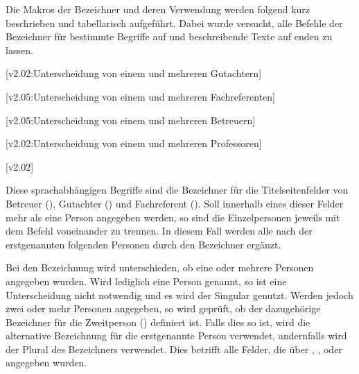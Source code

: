 \begin{DeclareEntity*}{}
\begin{DeclareEntity*}{}
\begin{DeclareEntity*}{}
Die Makros der Bezeichner und deren Verwendung werden folgend kurz beschrieben 
und tabellarisch aufgeführt. Dabei wurde versucht, alle Befehle der Bezeichner 
für bestimmte Begriffe auf  und beschreibende Texte auf 
 enden zu lassen.

\begin{Declaration}
  {}
  [v2.02:Unterscheidung von einem und mehreren Gutachtern]
\begin{Declaration}
  {}
\begin{Declaration}
  {}
  [v2.05:Unterscheidung von einem und mehreren Fachreferenten]
\begin{Declaration}
  {}
\begin{Declaration}
  {}
  [v2.05:Unterscheidung von einem und mehreren Betreuern]
\begin{Declaration}
  {}
\begin{Declaration}
  {}
  [v2.02:Unterscheidung von einem und mehreren Professoren]
\begin{Declaration}
  {}
  [v2.02]

Diese sprachabhängigen Begriffe sind die Bezeichner für die Titelseitenfelder 
von Betreuer (), Gutachter () und Fachreferent 
(). Soll innerhalb eines dieser Felder mehr als eine Person 
angegeben werden, so sind die Einzelpersonen jeweils mit dem Befehl  
voneinander zu trennen. In diesem Fall werden alle nach der erstgenannten 
folgenden Personen durch den Bezeichner  ergänzt.

%
Bei den Bezeichnung wird unterschieden, ob eine oder mehrere Personen angegeben 
wurden. Wird lediglich eine Person genannt, so ist eine Unterscheidung nicht 
notwendig und es wird der Singular genutzt. Werden jedoch zwei oder mehr 
Personen angegeben, so wird geprüft, ob der dazugehörige Bezeichner für die 
Zweitperson () definiert ist. Falls dies so ist, wird 
die alternative Bezeichnung für die erstgenannte Person verwendet, andernfalls 
wird der Plural des Bezeichners verwendet. Dies betrifft alle Felder, die über 
, ,  oder  
angegeben wurden.


\end{Declaration}
\end{Declaration}
\end{Declaration}
\end{Declaration}
\end{Declaration}
\end{Declaration}
\end{Declaration}
\end{Declaration}
\end{DeclareEntity*}
\end{DeclareEntity*}
\end{DeclareEntity*}
